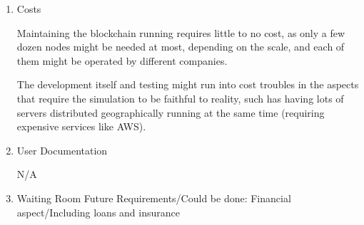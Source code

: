 \begin{enumerate}
    \item Costs
		\par Maintaining the blockchain running requires little to no cost, as only a few dozen nodes might be needed at most, depending on the scale, and each of them might be operated by different companies.
		\par The development itself and testing might run into cost troubles in the aspects that require the simulation to be faithful to reality, such has having lots of servers distributed geographically running at the same time (requiring expensive services like AWS).
    \item User Documentation
		\par N/A
    \item Waiting Room Future Requirements/Could be done: Financial aspect/Including loans and insurance

\end{enumerate}